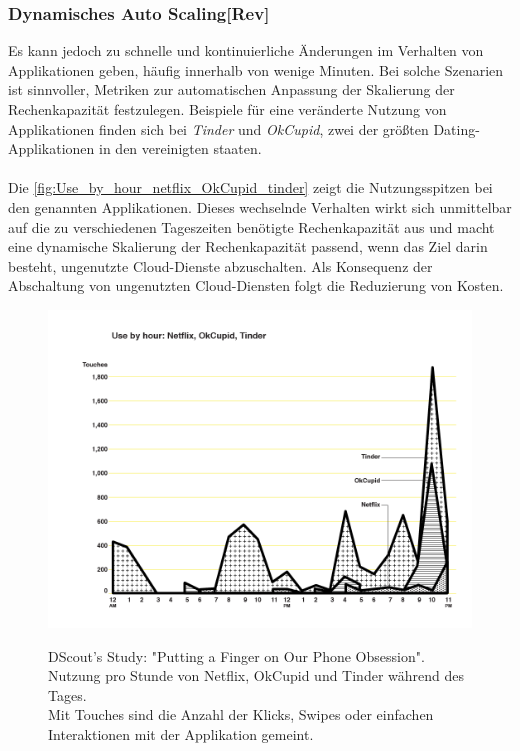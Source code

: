 \subsubsection{Dynamisches Auto Scaling[Rev]}
Es kann jedoch zu schnelle und kontinuierliche Änderungen im Verhalten von Applikationen geben, häufig innerhalb von wenige Minuten. Bei solche Szenarien ist sinnvoller, Metriken zur automatischen Anpassung der Skalierung der Rechenkapazität festzulegen. Beispiele für eine veränderte Nutzung von Applikationen finden sich bei \textit{Tinder} und \textit{OkCupid}, zwei der größten Dating-Applikationen in den vereinigten staaten. 
\\\\
Die \autoref{fig:Use_by_hour_netflix_OkCupid_tinder} zeigt die Nutzungsspitzen bei den genannten Applikationen. Dieses wechselnde Verhalten wirkt sich unmittelbar auf die zu verschiedenen Tageszeiten benötigte Rechenkapazität aus und macht eine dynamische Skalierung der Rechenkapazität passend, wenn das Ziel darin besteht, ungenutzte Cloud-Dienste abzuschalten. Als Konsequenz der Abschaltung von ungenutzten Cloud-Diensten folgt die Reduzierung von Kosten.
\begin{figure}[h!]
  \centering
  \includegraphics[scale=0.4]{sources/Use_by_hour_netflix_OkCupid_tinder}
  \caption[Nutzung von Tinder, OkCupid und Netflix pro Stunde]{}\label{fig:Use_by_hour_netflix_OkCupid_tinder} 
  DScout's Study: "Putting a Finger on Our Phone Obsession". \\
  Nutzung pro Stunde von Netflix, OkCupid und Tinder während des Tages\cite{SCOUT1}.
  \\Mit Touches sind die Anzahl der Klicks, Swipes oder einfachen Interaktionen mit der Applikation gemeint.
\end{figure}
